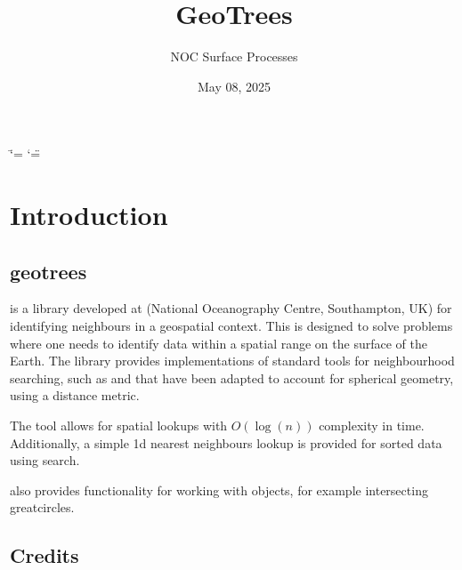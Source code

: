 \documentclass[letterpaper,10pt,english]{sphinxmanual}
\title{GeoTrees}
\date{May 08, 2025}
\author{NOC Surface Processes}
\begin{document}
\ifdefined\shorthandoff
  \ifnum\catcode`\=\string=\active\shorthandoff{=}\fi
  \ifnum\catcode`\"=\active{}\fi
\fi

\pagestyle{empty}
\sphinxmaketitle
\pagestyle{plain}
\sphinxtableofcontents
\pagestyle{normal}
\label{\detokenize{index::doc}}


\sphinxstepscope


\chapter{Introduction}
\label{\detokenize{introduction:introduction}}\label{\detokenize{introduction::doc}}

\section{geotrees}
\label{\detokenize{introduction:geotrees}}
\sphinxAtStartPar
{} is a  library developed at  (National Oceanography Centre, Southampton, UK) for
identifying neighbours in a geo\sphinxhyphen{}spatial context. This is designed to solve problems where one needs to identify
data within a spatial range on the surface of the Earth. The library provides implementations of standard tools
for neighbourhood searching, such as  and  that have been adapted to account for spherical
geometry, using a  distance metric.

\sphinxAtStartPar
The tool allows for spatial look\sphinxhyphen{}ups with \(O(\log(n))\) complexity in time. Additionally, a simple 1\sphinxhyphen{}d nearest
neighbours look\sphinxhyphen{}up is provided for sorted data using  search.

\sphinxAtStartPar
{} also provides functionality for working with  objects, for example intersecting
great\sphinxhyphen{}circles.


\section{Credits}
\label{\detokenize{introduction:credits}}
\end{document}
